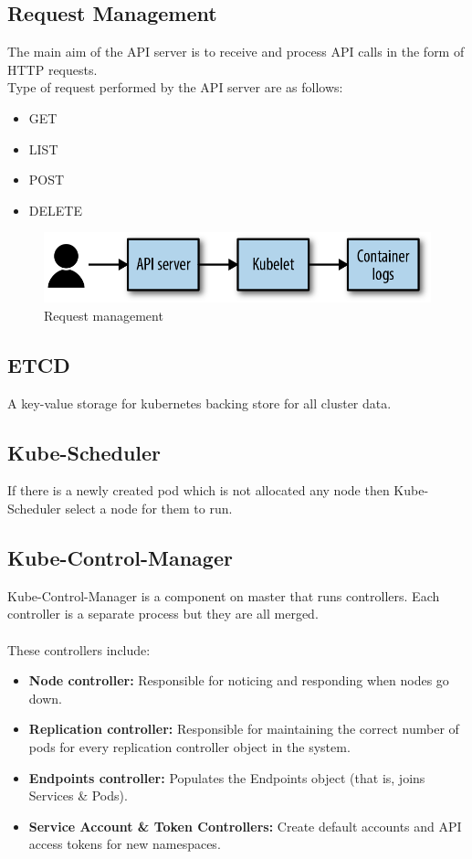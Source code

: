 \documentclass[12pt]{article}
\begin{document}
\subsection{Request Management}
The main aim of the API server is to receive and process API calls in the form of HTTP requests.\\
Type of request performed by the API server are as follows:
\begin{itemize}
	\item GET
	\item LIST
	\item POST
	\item DELETE
\end{itemize}
\begin{figure}[h!]
	\begin{center}
		\includegraphics*[totalheight=0.1\textheight]{kubereqman}
		\caption{Request management \cite{Request}}
	\end{center}
\end{figure}
\subsection{ETCD}
A key-value storage for kubernetes backing store for all cluster data.
\subsection{Kube-Scheduler}
If there is a newly created pod which is not allocated any node then Kube-Scheduler select a node for them to run.
\subsection{Kube-Control-Manager}
Kube-Control-Manager is a component on master that runs controllers.
Each controller is a separate process but they are all merged.\\\\
These controllers include:
\begin{itemize}
	\item \textbf{Node controller:} Responsible for noticing and responding when nodes go down.
	\item \textbf{Replication controller:} Responsible for maintaining the correct number of pods for every replication controller object in the system.
	\item \textbf{Endpoints controller:} Populates the Endpoints object (that is, joins Services \& Pods).
	\item \textbf{Service Account \& Token Controllers:} Create default accounts and API access tokens for new namespaces.
\end{itemize}
\end{document}
